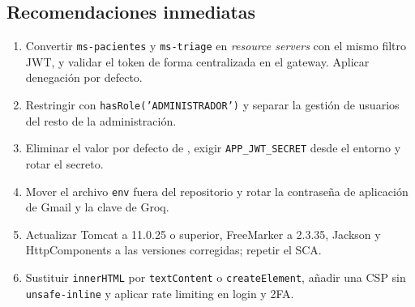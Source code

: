 \subsection{Recomendaciones inmediatas}

\begin{enumerate}
  \item Convertir \texttt{ms-pacientes} y \texttt{ms-triage} en \textit{resource
  servers} con el mismo filtro JWT, y validar el token de forma centralizada en
  el gateway. Aplicar denegación por defecto.
  \item Restringir  con
  \texttt{hasRole('ADMINISTRADOR')} y separar la gestión de usuarios del resto de
  la administración.
  \item Eliminar el valor por defecto de , exigir
  \texttt{APP\_JWT\_SECRET} desde el entorno y rotar el secreto.
  \item Mover el archivo \texttt{env} fuera del repositorio y rotar la contraseña
  de aplicación de Gmail y la clave de Groq.
  \item Actualizar Tomcat a 11.0.25 o superior, FreeMarker a 2.3.35, Jackson y
  HttpComponents a las versiones corregidas; repetir el SCA.
  \item Sustituir \texttt{innerHTML} por \texttt{textContent} o
  \texttt{createElement}, añadir una CSP sin \texttt{unsafe-inline} y aplicar
  rate limiting en login y 2FA.
\end{enumerate}



